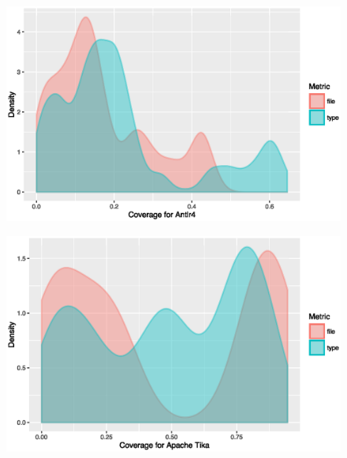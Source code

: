\documentclass[conference]{IEEEtran}
\begin{document}
\begin{figure}[!h]
\centering
\includegraphics[width=\columnwidth]{antlr-density}
\caption{}
\end{figure}

\begin{figure}[!h]
\centering
\includegraphics[width=\columnwidth]{tika-density}
\caption{}
\end{figure}
\end{document}
